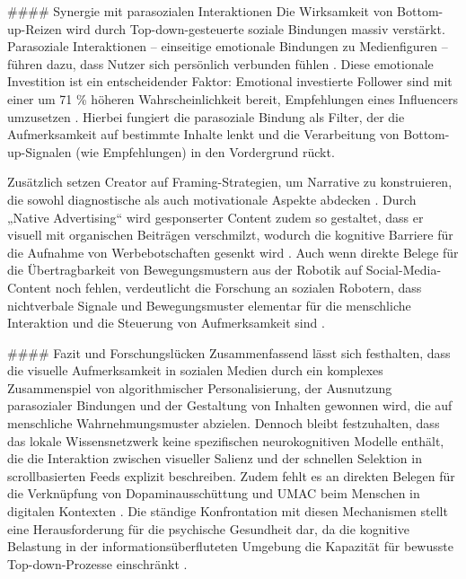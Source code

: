 \documentclass[11pt,a4paper]{article}
\begin{document}
\#\#\#\# Synergie mit parasozialen Interaktionen Die Wirksamkeit von Bottom-up-Reizen wird durch Top-down-gesteuerte soziale Bindungen massiv verstärkt. Parasoziale Interaktionen – einseitige emotionale Bindungen zu Medienfiguren – führen dazu, dass Nutzer sich persönlich verbunden fühlen \autocite{grey_grey_5d5c282590c448fc8776b04f78a08de5}. Diese emotionale Investition ist ein entscheidender Faktor: Emotional investierte Follower sind mit einer um 71 \% höheren Wahrscheinlichkeit bereit, Empfehlungen eines Influencers umzusetzen \autocite{grey_grey_5d5c282590c448fc8776b04f78a08de5}. Hierbei fungiert die parasoziale Bindung als Filter, der die Aufmerksamkeit auf bestimmte Inhalte lenkt und die Verarbeitung von Bottom-up-Signalen (wie Empfehlungen) in den Vordergrund rückt.

Zusätzlich setzen Creator auf Framing-Strategien, um Narrative zu konstruieren, die sowohl diagnostische als auch motivationale Aspekte abdecken \autocite{arxiv_2406_13820}. Durch „Native Advertising“ wird gesponserter Content zudem so gestaltet, dass er visuell mit organischen Beiträgen verschmilzt, wodurch die kognitive Barriere für die Aufnahme von Werbebotschaften gesenkt wird \autocite{openalex_W2946816985}. Auch wenn direkte Belege für die Übertragbarkeit von Bewegungsmustern aus der Robotik auf Social-Media-Content noch fehlen, verdeutlicht die Forschung an sozialen Robotern, dass nichtverbale Signale und Bewegungsmuster elementar für die menschliche Interaktion und die Steuerung von Aufmerksamkeit sind \autocite{arxiv_2301_09025}.

\#\#\#\# Fazit und Forschungslücken Zusammenfassend lässt sich festhalten, dass die visuelle Aufmerksamkeit in sozialen Medien durch ein komplexes Zusammenspiel von algorithmischer Personalisierung, der Ausnutzung parasozialer Bindungen und der Gestaltung von Inhalten gewonnen wird, die auf menschliche Wahrnehmungsmuster abzielen. Dennoch bleibt festzuhalten, dass das lokale Wissensnetzwerk keine spezifischen neurokognitiven Modelle enthält, die die Interaktion zwischen visueller Salienz und der schnellen Selektion in scrollbasierten Feeds explizit beschreiben. Zudem fehlt es an direkten Belegen für die Verknüpfung von Dopaminausschüttung und UMAC beim Menschen in digitalen Kontexten \autocite{europepmc_42137086}. Die ständige Konfrontation mit diesen Mechanismen stellt eine Herausforderung für die psychische Gesundheit dar, da die kognitive Belastung in der informationsüberfluteten Umgebung die Kapazität für bewusste Top-down-Prozesse einschränkt \autocite{grey_grey_d4bc9c0d0e8441ba90398520e73af07d}.
\end{document}
